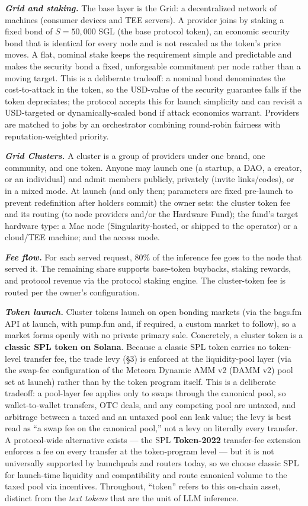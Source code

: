 \documentclass[11pt]{article}
\newcommand{\ph}[1]{\textbf{\textit{#1}}}
\begin{document}
\ph{Grid and staking.} The base layer is the Grid: a decentralized network of machines (consumer devices and TEE servers). A provider joins by staking a fixed bond of $S = 50{,}000$ SGL (the base protocol token), an economic security bond that is identical for every node and is not rescaled as the token's price moves. A flat, nominal stake keeps the requirement simple and predictable and makes the security bond a fixed, unforgeable commitment per node rather than a moving target. This is a deliberate tradeoff: a nominal bond denominates the cost-to-attack in the token, so the USD-value of the security guarantee falls if the token depreciates; the protocol accepts this for launch simplicity and can revisit a USD-targeted or dynamically-scaled bond if attack economics warrant. Providers are matched to jobs by an orchestrator combining round-robin fairness with reputation-weighted priority.

\ph{Grid Clusters.} A cluster is a group of providers under one brand, one community, and one token. Anyone may launch one (a startup, a DAO, a creator, or an individual) and admit members publicly, privately (invite links/codes), or in a mixed mode. At launch (and only then; parameters are fixed pre-launch to prevent redefinition after holders commit) the owner sets: the cluster token fee and its routing (to node providers and/or the Hardware Fund); the fund's target hardware type: a Mac node (Singularity-hosted, or shipped to the operator) or a cloud/TEE machine; and the access mode.

\ph{Fee flow.} For each served request, 80\% of the inference fee goes to the node that served it. The remaining share supports base-token buybacks, staking rewards, and protocol revenue via the protocol staking engine. The cluster-token fee is routed per the owner's configuration.

\ph{Token launch.} Cluster tokens launch on open bonding markets (via the bags.fm API at launch, with pump.fun and, if required, a custom market to follow), so a market forms openly with no private primary sale. Concretely, a cluster token is a \textbf{classic SPL token on Solana}. Because a classic SPL token carries no token-level transfer fee, the trade levy (\S3) is enforced at the liquidity-pool layer (via the swap-fee configuration of the Meteora Dynamic AMM v2 (DAMM v2) pool set at launch) rather than by the token program itself. This is a deliberate tradeoff: a pool-layer fee applies only to swaps through the canonical pool, so wallet-to-wallet transfers, OTC deals, and any competing pool are untaxed, and arbitrage between a taxed and an untaxed pool can leak value; the levy is best read as ``a swap fee on the canonical pool,'' not a levy on literally every transfer. A protocol-wide alternative exists --- the SPL \textbf{Token-2022} transfer-fee extension enforces a fee on every transfer at the token-program level --- but it is not universally supported by launchpads and routers today, so we choose classic SPL for launch-time liquidity and compatibility and route canonical volume to the taxed pool via incentives. Throughout, ``token'' refers to this on-chain asset, distinct from the \textit{text tokens} that are the unit of LLM inference.
\end{document}
